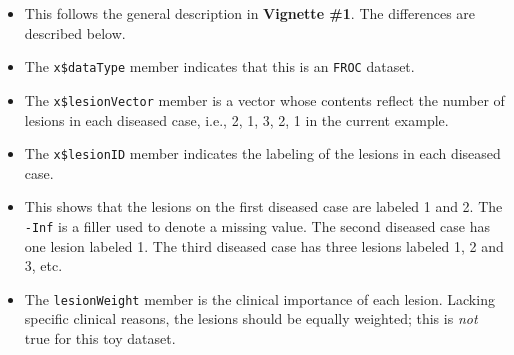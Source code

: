 \documentclass[]{book}
\newenvironment{Shaded}{\begin{snugshade}}{\end{snugshade}}
\newcommand{\CommentTok}[1]{\textcolor[rgb]{0.56,0.35,0.01}{\textit{#1}}}
\newcommand{\NormalTok}[1]{#1}
\newcommand{\OperatorTok}[1]{\textcolor[rgb]{0.81,0.36,0.00}{\textbf{#1}}}
\providecommand{\tightlist}{%
  \setlength{\itemsep}{0pt}\setlength{\parskip}{0pt}}
\begin{document}
\begin{itemize}
\tightlist
\item
  This follows the general description in \textbf{Vignette \#1}. The differences are described below.
\item
  The \texttt{x\$dataType} member indicates that this is an \texttt{FROC} dataset.
\item
  The \texttt{x\$lesionVector} member is a vector whose contents reflect the number of lesions in each diseased case, i.e., 2, 1, 3, 2, 1 in the current example.
\item
  The \texttt{x\$lesionID} member indicates the labeling of the lesions in each diseased case.
\end{itemize}

\begin{Shaded}
\end{Shaded}

\begin{itemize}
\tightlist
\item
  This shows that the lesions on the first diseased case are labeled 1 and 2. The \texttt{-Inf} is a filler used to denote a missing value. The second diseased case has one lesion labeled 1. The third diseased case has three lesions labeled 1, 2 and 3, etc.
\item
  The \texttt{lesionWeight} member is the clinical importance of each lesion. Lacking specific clinical reasons, the lesions should be equally weighted; this is \emph{not} true for this toy dataset.
\end{itemize}

\begin{Shaded}
\end{Shaded}
\end{document}
